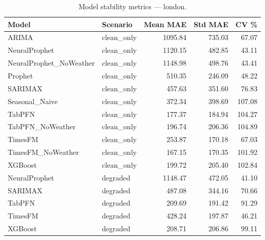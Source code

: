 \begin{table}[h]
\centering
\caption{Model stability metrics — london.}
\label{tab:stability_london}
\begin{tabular}{llrrr}
\toprule
Model & Scenario & Mean MAE & Std MAE & CV \% \\
\midrule
ARIMA & clean\_only & 1095.84 & 735.03 & 67.07 \\
NeuralProphet & clean\_only & 1120.15 & 482.85 & 43.11 \\
NeuralProphet_NoWeather & clean\_only & 1148.98 & 498.76 & 43.41 \\
Prophet & clean\_only & 510.35 & 246.09 & 48.22 \\
SARIMAX & clean\_only & 457.63 & 351.60 & 76.83 \\
Seasonal_Naive & clean\_only & 372.34 & 398.69 & 107.08 \\
TabPFN & clean\_only & 177.37 & 184.94 & 104.27 \\
TabPFN_NoWeather & clean\_only & 196.74 & 206.36 & 104.89 \\
TimesFM & clean\_only & 253.87 & 170.18 & 67.03 \\
TimesFM_NoWeather & clean\_only & 167.15 & 170.35 & 101.92 \\
XGBoost & clean\_only & 199.72 & 205.40 & 102.84 \\
NeuralProphet & degraded & 1148.47 & 472.05 & 41.10 \\
SARIMAX & degraded & 487.08 & 344.16 & 70.66 \\
TabPFN & degraded & 209.69 & 191.42 & 91.29 \\
TimesFM & degraded & 428.24 & 197.87 & 46.21 \\
XGBoost & degraded & 208.71 & 206.86 & 99.11 \\
\bottomrule
\end{tabular}
\end{table}
